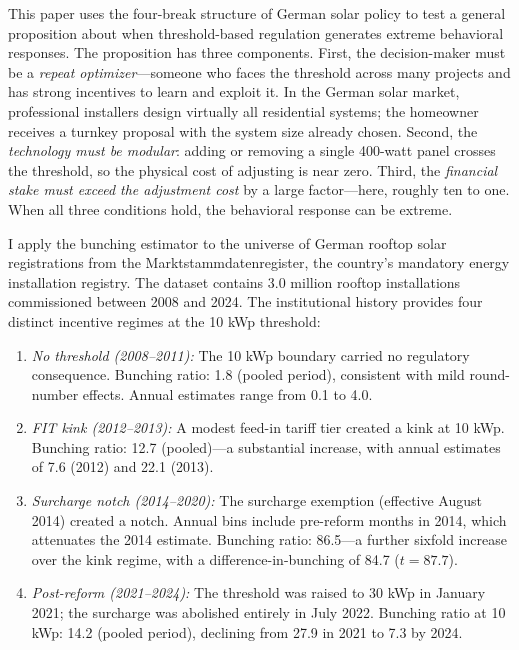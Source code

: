 \documentclass[12pt]{article}
\begin{document}
This paper uses the four-break structure of German solar policy to test a general proposition about when threshold-based regulation generates extreme behavioral responses. The proposition has three components. First, the decision-maker must be a \textit{repeat optimizer}---someone who faces the threshold across many projects and has strong incentives to learn and exploit it. In the German solar market, professional installers design virtually all residential systems; the homeowner receives a turnkey proposal with the system size already chosen. Second, the \textit{technology must be modular}: adding or removing a single 400-watt panel crosses the threshold, so the physical cost of adjusting is near zero. Third, the \textit{financial stake must exceed the adjustment cost} by a large factor---here, roughly ten to one. When all three conditions hold, the behavioral response can be extreme.

I apply the \citet{kleven2013using} bunching estimator to the universe of German rooftop solar registrations from the Marktstammdatenregister, the country's mandatory energy installation registry. The dataset contains 3.0 million rooftop installations commissioned between 2008 and 2024. The institutional history provides four distinct incentive regimes at the 10 kWp threshold:

\begin{enumerate}
  \item \textit{No threshold (2008--2011):} The 10 kWp boundary carried no regulatory consequence. Bunching ratio: 1.8 (pooled period), consistent with mild round-number effects. Annual estimates range from 0.1 to 4.0.
  \item \textit{FIT kink (2012--2013):} A modest feed-in tariff tier created a kink at 10 kWp. Bunching ratio: 12.7 (pooled)---a substantial increase, with annual estimates of 7.6 (2012) and 22.1 (2013).
  \item \textit{Surcharge notch (2014--2020):} The surcharge exemption (effective August 2014) created a notch. Annual bins include pre-reform months in 2014, which attenuates the 2014 estimate. Bunching ratio: 86.5---a further sixfold increase over the kink regime, with a difference-in-bunching of 84.7 ($t = 87.7$).
  \item \textit{Post-reform (2021--2024):} The threshold was raised to 30 kWp in January 2021; the surcharge was abolished entirely in July 2022. Bunching ratio at 10 kWp: 14.2 (pooled period), declining from 27.9 in 2021 to 7.3 by 2024.
\end{enumerate}
\end{document}
